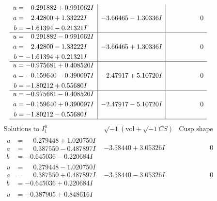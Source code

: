 \documentclass[1p]{elsarticle_modified}
\theoremstyle{definition}
\newcommand{\I}{\sqrt{-1}}
\begin{document}
$$\begin{array}{c|c|c}
\begin{aligned}
u &= \phantom{-}0.291882 + 0.991062 I \\
a &= \phantom{-}2.42800 + 1.33222 I \\
b &= -1.61394 - 0.21321 I\end{aligned}
 & -3.66465 - 1.30336 I & \phantom{-0.000000 } 0 \\ \hline\begin{aligned}
u &= \phantom{-}0.291882 - 0.991062 I \\
a &= \phantom{-}2.42800 - 1.33222 I \\
b &= -1.61394 + 0.21321 I\end{aligned}
 & -3.66465 + 1.30336 I & \phantom{-0.000000 } 0 \\ \hline\begin{aligned}
u &= -0.975681 + 0.408520 I \\
a &= -0.159640 - 0.390097 I \\
b &= -1.80212 + 0.55680 I\end{aligned}
 & -2.47917 + 5.10720 I & \phantom{-0.000000 } 0 \\ \hline\begin{aligned}
u &= -0.975681 - 0.408520 I \\
a &= -0.159640 + 0.390097 I \\
b &= -1.80212 - 0.55680 I\end{aligned}
 & -2.47917 - 5.10720 I & \phantom{-0.000000 } 0\\
 \hline 
 \end{array}$$\newpage$$\begin{array}{c|c|c}  
\text{Solutions to }I^u_{1}& \I (\text{vol} + \sqrt{-1}CS) & \text{Cusp shape}\\
 \hline 
\begin{aligned}
u &= \phantom{-}0.279448 + 1.020750 I \\
a &= \phantom{-}0.387550 - 0.487897 I \\
b &= -0.645036 - 0.220684 I\end{aligned}
 & -3.58440 + 3.05326 I & \phantom{-0.000000 } 0 \\ \hline\begin{aligned}
u &= \phantom{-}0.279448 - 1.020750 I \\
a &= \phantom{-}0.387550 + 0.487897 I \\
b &= -0.645036 + 0.220684 I\end{aligned}
 & -3.58440 - 3.05326 I & \phantom{-0.000000 } 0 \\ \hline\begin{aligned}
u &= -0.387905 + 0.848616 I \\

\end{aligned}
\end{array}$$
\end{document}
